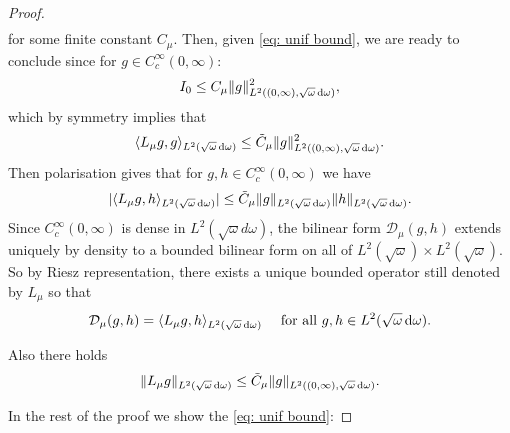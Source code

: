\documentclass[reqno,11pt,letterpaper]{amsart}
\numberwithin{equation}{section}
\newcommand{\dd}{\, {\rm d}}
\begin{document}
\begin{proof}
\begin{align}
    \end{align}
    for some finite constant $C_\mu$. Then, given \eqref{eq: unif bound},  we are ready to conclude since for $g \in C_c^\infty(0,\infty)$:  
    $$I_0 \leq C_\mu \|g\|_{L^2((0, \infty), \sqrt{\omega} \dd \omega)}^2, $$
    which by symmetry implies that  
    $$ \langle L_\mu g, g \rangle_{L^2(\sqrt{\omega} \dd \omega)} \leq \tilde{C}_\mu \|g\|_{L^2((0, \infty), \sqrt{\omega} \dd \omega)}^2.$$
    Then polarisation gives  that for $g, h \in C_c^\infty (0,\infty)$ we have 
    $$ \vert \langle L_\mu g, h \rangle_{L^2(\sqrt{\omega} \dd \omega)} \vert
    \leq \tilde{C}_\mu \|g\|_{L^2(\sqrt{\omega} \dd \omega)} \|h\|_{L^2(\sqrt{\omega} \dd \omega)}. $$
    Since $C_c^\infty(0,\infty)$ is dense in $L^2(\sqrt{\omega} d \omega)$, the bilinear form $\mathcal{D}_\mu(g,h)$ extends uniquely by density to a bounded bilinear form on all of $L^2(\sqrt{\omega})\times L^2(\sqrt{\omega})$. So by Riesz representation, there exists a unique bounded operator still denoted by $L_\mu$ so that 
    $$ \mathcal{D}_\mu(g,h) = \langle L_\mu g, h \rangle_{L^2(\sqrt{\omega} \dd \omega)} \quad \text{ for all } g,h \in L^2(\sqrt{\omega} \dd \omega).$$
    
    Also there holds 
    $$ \|L_\mu g \|_{L^2(\sqrt{\omega}\dd \omega)} \leq \tilde{C}_\mu \|g\|_{L^2((0, \infty), \sqrt{\omega} \dd \omega)}.$$
    
    In the rest of the proof we show the \eqref{eq: unif bound}:


\end{proof}
\end{document}
